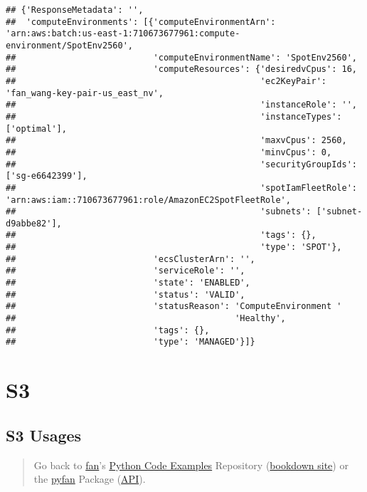 \documentclass[
]{book}
\begin{document}
\begin{verbatim}
## {'ResponseMetadata': '',
##  'computeEnvironments': [{'computeEnvironmentArn': 'arn:aws:batch:us-east-1:710673677961:compute-environment/SpotEnv2560',
##                           'computeEnvironmentName': 'SpotEnv2560',
##                           'computeResources': {'desiredvCpus': 16,
##                                                'ec2KeyPair': 'fan_wang-key-pair-us_east_nv',
##                                                'instanceRole': '',
##                                                'instanceTypes': ['optimal'],
##                                                'maxvCpus': 2560,
##                                                'minvCpus': 0,
##                                                'securityGroupIds': ['sg-e6642399'],
##                                                'spotIamFleetRole': 'arn:aws:iam::710673677961:role/AmazonEC2SpotFleetRole',
##                                                'subnets': ['subnet-d9abbe82'],
##                                                'tags': {},
##                                                'type': 'SPOT'},
##                           'ecsClusterArn': '',
##                           'serviceRole': '',
##                           'state': 'ENABLED',
##                           'status': 'VALID',
##                           'statusReason': 'ComputeEnvironment '
##                                           'Healthy',
##                           'tags': {},
##                           'type': 'MANAGED'}]}
\end{verbatim}

\hypertarget{s3}{%
\section{S3}\label{s3}}

\hypertarget{s3-usages}{%
\subsection{S3 Usages}\label{s3-usages}}

\begin{quote}
Go back to \href{http://fanwangecon.github.io/}{fan}'s \href{https://fanwangecon.github.io/Py4Econ/}{Python Code Examples} Repository (\href{https://fanwangecon.github.io/Py4Econ/bookdown}{bookdown site}) or the \href{https://pyfan.readthedocs.io/en/latest/}{pyfan} Package (\href{https://pyfan.readthedocs.io/en/latest/reference.html}{API}).
\end{quote}
\end{document}
